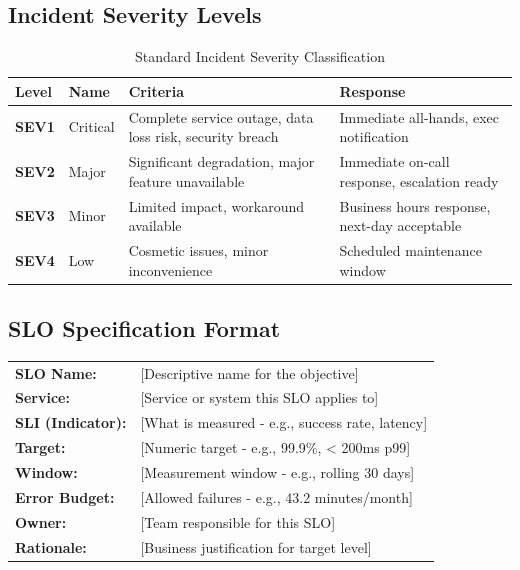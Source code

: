 \documentclass[11pt,letterpaper]{article}
\begin{document}
\subsection{Incident Severity Levels}

\begin{table}[H]
\centering
\caption{Standard Incident Severity Classification}
\small
\begin{tabular}{@{}C{1.2cm}L{2.5cm}L{5cm}L{4.5cm}@{}}
\toprule
\textbf{Level} & \textbf{Name} & \textbf{Criteria} & \textbf{Response} \\
\midrule
{}\textbf{SEV1} & Critical & Complete service outage, data loss risk, security breach & Immediate all-hands, exec notification \\
\addlinespace
{}\textbf{SEV2} & Major & Significant degradation, major feature unavailable & Immediate on-call response, escalation ready \\
\addlinespace
{}\textbf{SEV3} & Minor & Limited impact, workaround available & Business hours response, next-day acceptable \\
\addlinespace
{}\textbf{SEV4} & Low & Cosmetic issues, minor inconvenience & Scheduled maintenance window \\
\bottomrule
\end{tabular}
\end{table}

\subsection{SLO Specification Format}

\begin{slobox}
\begin{tabular}{@{}L{3.5cm}L{10cm}@{}}
\textbf{SLO Name:} & [Descriptive name for the objective] \\
\textbf{Service:} & [Service or system this SLO applies to] \\
\textbf{SLI (Indicator):} & [What is measured - e.g., success rate, latency] \\
\textbf{Target:} & [Numeric target - e.g., 99.9\%, < 200ms p99] \\
\textbf{Window:} & [Measurement window - e.g., rolling 30 days] \\
\textbf{Error Budget:} & [Allowed failures - e.g., 43.2 minutes/month] \\
\textbf{Owner:} & [Team responsible for this SLO] \\
\textbf{Rationale:} & [Business justification for target level] \\
\end{tabular}
\end{slobox}
\end{document}
